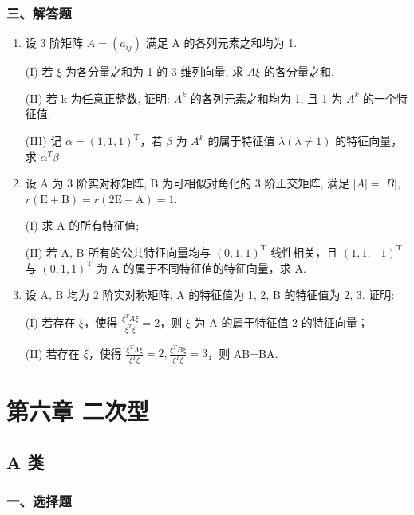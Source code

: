 \documentclass[12pt, a4paper]{ctexart}
\begin{document}
\subsubsection*{三、解答题}

\begin{enumerate}[start=5]
    \item 设 3 阶矩阵 $ A = (a_{ij}) $ 满足 A 的各列元素之和均为 1.
    
    (I) 若 $ \xi $ 为各分量之和为 1 的 3 维列向量, 求 $ A\xi $ 的各分量之和.
    
    (II) 若 k 为任意正整数, 证明: $ A^{k} $ 的各列元素之和均为 1, 且 1 为 $ A^{k} $ 的一个特征值.
    
    (III) 记 $ \alpha=(1,1,1)^{\mathrm{T}} $，若 $ \beta $ 为 $ A^{k} $ 的属于特征值 $ \lambda(\lambda\neq1) $ 的特征向量，求 $ \alpha^{T}\beta $

    \item 设 A 为 3 阶实对称矩阵, B 为可相似对角化的 3 阶正交矩阵, 满足 $ \left|A\right|=\left|B\right| $, $ r\left(\mathrm{E}+\mathrm{B}\right)=r\left(2\mathrm{E}-\mathrm{A}\right)=1. $
    
    (I) 求 A 的所有特征值;
    
    (II) 若 A, B 所有的公共特征向量均与 $ (0,1,1)^{\mathrm{T}} $ 线性相关，且 $ (1,1,-1)^{\mathrm{T}} $ 与 $ (0,1,1)^{\mathrm{T}} $ 为 A 的属于不同特征值的特征向量，求 A.

    \item 设 A, B 均为 2 阶实对称矩阵, A 的特征值为 1, 2, B 的特征值为 2, 3. 证明:
    
    (I) 若存在 $ \xi $，使得 $ \frac{\xi^{T}A\xi}{\xi^{T}\xi}=2 $，则 $ \xi $ 为 A 的属于特征值 2 的特征向量；
    
    (II) 若存在 $ \xi $，使得 $ \frac{\xi^{T}A\xi}{\xi^{T}\xi}=2,\frac{\xi^{T}B\xi}{\xi^{T}\xi}=3 $，则 AB=BA.
\end{enumerate}

\section{第六章 二次型}

\subsection{A 类}

\subsubsection*{一、选择题}
\end{document}
